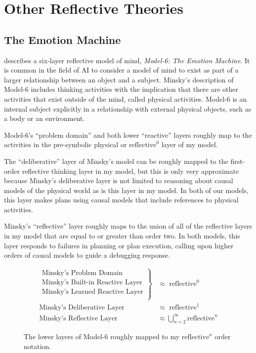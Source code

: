 \chapter{Other Reflective Theories}
\label{chapter:other_reflective_theories}

\section{The Emotion Machine}
\label{backreference:self_reflective_self_conscious}

\cite{minsky:2006} describes a six-layer reflective model of mind,
\emph{\mbox{Model-6}: The Emotion Machine}.  It is common in the field of AI
to consider a model of mind to exist as part of a larger relationship
between an object and a subject.  Minsky's description of \mbox{Model-6}
includes thinking activities with the implication that there are other
activities that exist outside of the mind, called physical activities.
\mbox{Model-6} is an internal subject explicitly in a relationship with
external physical objects, such as a body or an environment.

\mbox{Model-6}'s ``problem domain'' and both lower ``reactive'' layers
roughly map to the activities in the pre-symbolic physical or
$\text{reflective}^0$ layer of my model.

The ``deliberative'' layer of Minsky's model can be roughly mapped to
the first-order reflective thinking layer in my model, but this is
only very approximate because Minsky's deliberative layer is not
limited to reasoning about causal models of the physical world as is
this layer in my model.  In both of our models, this layer makes plans
using causal models that include references to physical activities.

Minsky's ``reflective'' layer roughly maps to the union of all of the
reflective layers in my model that are equal to or greater than order
two.  In both models, this layer responds to failures in planning or
plan execution, calling upon higher orders of causal models to guide a
debugging response.

\begin{figure}[bth]
\begin{align*}
\left.
  \begin{array}{l}
    \text{Minsky's Problem Domain}\\
    \text{Minsky's Built-in Reactive Layer}\\
    \text{Minsky's Learned Reactive Layer}\\
  \end{array}
\right\}                            &{\approx} \text{ reflective}^0 \\
\text{Minsky's Deliberative Layer } &{\approx} \text{ reflective}^1 \\
\text{Minsky's Reflective Layer }   &{\approx} \bigcup_{n=2}^{\infty}{\text{reflective}^n}
\end{align*}
\caption{The lower layers of Model-6 roughly mapped to my
  $\text{reflective}^n$ order notation.}
\label{figure:model_6_as_reflective_order_notation}
\end{figure}

